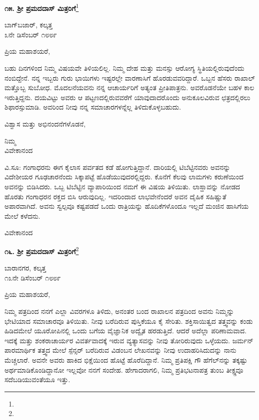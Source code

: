 \begin{center}
\textbf{೧೫. ಶ‍್ರೀ ಪ್ರಮದದಾಸ್ ಮಿತ್ರರಿಗೆ}\footnote{}
\end{center}

\vspace{-0.8cm}

\begin{flushright}
ಬಾಗ್‌ಬಜಾರ್, ಕಲ್ಕತ್ತ\\೩ನೇ ಡಿಸೆಂಬರ್ ೧೮೮೯
\end{flushright}
\vspace{-0.5cm}

\noindent
ಪ್ರಿಯ ಮಹಾಶಯರೆ,

ಬಹು ದಿನಗಳಿಂದ ನಿಮ್ಮ ವಿಷಯವೇ ತಿಳಿಯಲಿಲ್ಲ. ನಿಮ್ಮ ದೇಹ ಮತ್ತು ಮನಸ್ಸು ಆರೋಗ್ಯ ಸ್ಥಿತಿಯಲ್ಲಿರುವುದೆಂದು ನಂಬಿದ್ದೇನೆ. ನನ್ನ ಇಬ್ಬರು ಗುರು ಭಾಯಿಗಳು ಇಷ್ಟರಲ್ಲೇ ವಾರಣಾಸಿಗೆ ಹೊರಡುವವರಿದ್ದಾರೆ. ಒಬ್ಬನ ಹೆಸರು ರಾಖಾಲ್ ಮತ್ತೊಬ್ಬ ಸುಬೋಧ. ಮೊದಲನೆಯವನು ನನ್ನ ಆಚಾರ್ಯರಿಗೆ ಅತ್ಯಂತ ಪ್ರೀತಿಪಾತ್ರನು. ಅವರೊಡನೆಯೇ ಬಹಳ ಕಾಲ ಇರುತ್ತಿದ್ದನು. ದಯವಿಟ್ಟು ಅವರು ಆ ಪಟ್ಟಣದಲ್ಲಿರುವವರೆಗೆ ಯಾವುದಾದರೊಂದು ಅನುಕೂಲವಿರುವ ಛತ್ರದಲ್ಲಿರಲು ಶಿಫಾರಸ್ಸುಮಾಡಿ. ಅವರಿಂದ ನೀವು ನನ್ನ ಸಮಾಚಾರಗಳನ್ನೆಲ್ಲ ತಿಳಿದುಕೊಳ್ಳಬಹುದು.

ವಿಶ್ವಾಸ ಮತ್ತು ಅಭಿನಂದನೆಗಳೊಡನೆ,
\vspace{-0.3cm}

{\flushright
ನಿಮ್ಮ\\ವಿವೇಕಾನಂದ\par}

ವಿ.ಸೂ: ಗಂಗಾಧರನು ಈಗ ಕೈಲಾಸ ಪರ್ವತದ ಕಡೆ ಹೋಗುತ್ತಿದ್ದಾನೆ. ದಾರಿಯಲ್ಲಿ ಟಿಬೆಟ್ಟಿನವರು ಅವನನ್ನು ವಿದೇಶೀಯರ ಗೂಢಚಾರನೆಂದು ಸಿಕ್ಕಾಪಟ್ಟೆ ಹೊಡೆಯುವುದರಲ್ಲಿದ್ದರು. ಕೊನೆಗೆ ಕೆಲವು ಲಾಮಗಳು ಕರುಣೆಯಿಂದ ಅವನನ್ನು ಬಿಡಿಸಿದರು. ಒಬ್ಬ ಟಿಬೆಟ್ಟಿನ ವ್ಯಾಪಾರಿಯಿಂದ ನಮಗೆ ಈ ವಿಷಯ ತಿಳಿಯಿತು. ಲಾಸ್ಹಾವನ್ನು ನೋಡದ ಹೊರತು ಗಂಗಾಧರನ ರಕ್ತದ ಬಿಸಿ ಆರುವುದಿಲ್ಲ. ಇದರಿಂದಾದ ಲಾಭವೇನೆಂದರೆ ಅವನ ದೈಹಿಕ ಸಹಿಷ್ಣುತೆ ಅಪಾರವಾಗಿದೆ. ಅವನು ಸ್ವಲ್ಪವೂ ಕಷ್ಟಪಡದೆ ಒಂದು ರಾತ್ರಿಯನ್ನು ಹೊದಿಕೆಗಳೊಂದೂ ಇಲ್ಲದೆ ಮಂಜಿನ ಹಾಸಿಗೆಯ ಮೇಲೆ ಕಳೆದನು.

{\flushright
ವಿವೇಕಾನಂದ\par}

\begin{center}
\textbf{೧೬. ಶ‍್ರೀ ಪ್ರಮದದಾಸ್ ಮಿತ್ರರಿಗೆ}\footnote{}
\end{center}

\begin{flushright}
ಬಾರಾನಗರ, ಕಲ್ಕತ್ತ\\೧೩ನೇ ಡಿಸೆಂಬರ್ ೧೮೮೯
\end{flushright}

\noindent
ಪ್ರಿಯ ಮಹಾಶಯರೆ,

ನಿಮ್ಮ ಪತ್ರದಿಂದ ನನಗೆ ಎಲ್ಲಾ ವಿವರಗಳೂ ತಿಳಿದು, ಅನಂತರ ಬಂದ ರಾಖಾಲನ ಪತ್ರದಿಂದ ಅವನು ನಿಮ್ಮನ್ನು ಭೇಟಿಯಾದ ಸಮಾಚಾರವೂ ತಿಳಿಯಿತು. ನೀವು ಬರೆದಿರುವ ಪುಸ್ತಿಕೆಯೂ ಕೈ ಸೇರಿತು. ಶಕ್ತಿಸಾಯಿತ್ವದ ತತ್ತ್ವವನ್ನು ಕಂಡು ಹಿಡಿದಮೇಲೆ ಯೂರೋಪಿನಲ್ಲಿ ಒಂದು ಬಗೆಯ ವೈಜ್ಞಾನಿಕ ಅದ್ವೈತ ಹರಡುತ್ತಿದೆ. ಆದರೆ ಅದೆಲ್ಲಾ ಪರಿಣಾಮವಾದ. ಇದಕ್ಕೆ ಮತ್ತು ಶಂಕರಾಚಾರ್ಯರ ವಿವರ್ತವಾದಕ್ಕೆ ಇರುವ ವ್ಯತ್ಯಾಸವನ್ನು ನೀವು ತೋರಿರುವುದು ಒಳ್ಳೆಯದು. ಜರ್ಮನ್ ಪಾರಮಾರ್ಥಿಕ ತತ್ತ್ವದ ಮೇಲೆ ಸ್ಪೆನ್ಸರ್ ಬರೆದಿರುವ ವಿಡಂಬನ ಲೇಖನವನ್ನು ನೀವು ಉದಾಹರಿಸಿದುದನ್ನು ನಾನು ಮೆಚ್ಚಲಾರೆ. ಅವನೇ ಅವರು ಹಾಕಿದ ಭಿಕ್ಷೆಯಿಂದ ಹೊಟ್ಟೆ ಹೊರೆದಿದ್ದಾನೆ. ನಿಮ್ಮ ಪ್ರತಿಪಕ್ಷಿ ಗೌ  ಹೆಗೆಲ್‌ನನ್ನು ತಕ್ಕಷ್ಟು ಅರ್ಥಮಾಡಿಕೊಂಡಿದ್ದಾನೋ ಇಲ್ಲವೋ ನನಗೆ ಸಂದೇಹ. ಹೇಗಾದರಾಗಲಿ, ನಿಮ್ಮ ಪ್ರತಿಭಟನಾಪತ್ರ ತುಂಬ ತೀಕ್ಷ್ಣವೂ ಸದೆಬಡಿಯುವಂತೆಯೂ ಇತ್ತು.

